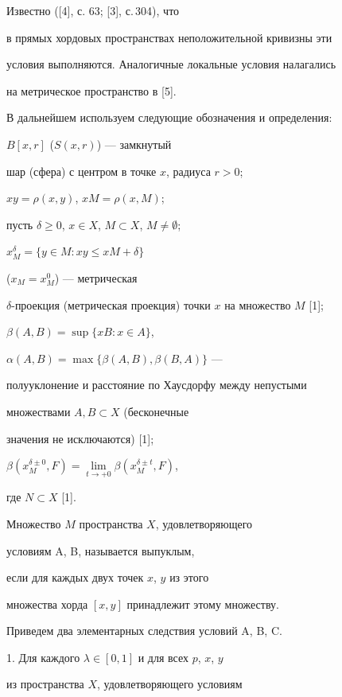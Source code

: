 Известно ([4], с. 63; [3], с.\,304), что 


в прямых хордовых пространствах неположительной кривизны эти 


условия выполняются. Аналогичные локальные условия налагались 


на метрическое пространство в [5].


 


В дальнейшем используем следующие обозначения и определения:


$B[x,r]$ ($S(x,r)$) --- замкнутый 


шар (сфера) с центром в точке $x$, радиуса $r>0$;


$xy = \rho (x,y)$, $xM = \rho (x,M)$;


пусть $\delta \geq 0$, $x \in X$, $M \subset X$, $M \neq \emptyset$;


$x_{M}^{\delta} = \{y \in M : xy \le xM + \delta \}$


($ x_{M} = x_{M}^{0}$) --- метрическая


$\delta$-проекция (метрическая проекция) точки $x$ на множество $M$ [1];


$\beta (A,B) = \sup \{xB : x \in A \}$,


$\alpha (A,B) = \max \{\beta (A,B),\beta (B,A)\}$ ---


полууклонение и расстояние по Хаусдорфу между непустыми


множествами $A, B \subset X$ (бесконечные 


значения не исключаются) [1];


$\beta (x_{M}^{\delta \pm 0},F) =


\lim \limits_{t \to +0}{\beta (x_{M}^{\delta \pm t},F)}$,


где $N \subset X$ [1].


Множество $M$ пространства $X$, удовлетворяющего 


условиям A, B, называется выпуклым,


если для каждых двух точек $x$, $y$ из этого 


множества хорда $[x,y]$ принадлежит этому множеству.





Приведем два элементарных следствия условий A, B, C.





1. Для каждого $\lambda \in [0,1]$ и для всех $p$, $x$, $y$ 


из пространства $X$, удовлетворяющего условиям


